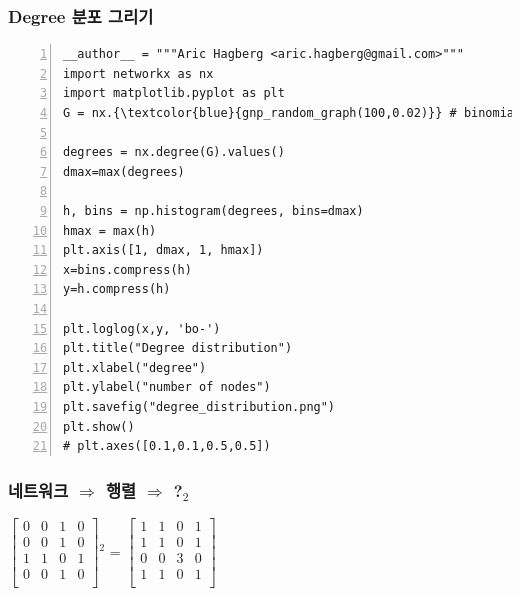 \documentclass{beamer}
\newcommand{\fbckg}[1]{\usebackgroundtemplate{\texttt{[image: \#1]}}}%
\begin{document}
{
\fbckg{degree_distribution2.png}
\begin{frame}[fragile]
\frametitle{Degree 분포 그리기}
\tiny\begin{Verbatim}[numbers=left,commandchars=\\\{\}]
__author__ = """Aric Hagberg <aric.hagberg@gmail.com>"""
import networkx as nx
import matplotlib.pyplot as plt
G = nx.{\textcolor{blue}{gnp_random_graph(100,0.02)}} # binomial_graph 생성

degrees = nx.degree(G).values()
dmax=max(degrees)

h, bins = np.histogram(degrees, bins=dmax)
hmax = max(h)
plt.axis([1, dmax, 1, hmax])
x=bins.compress(h)
y=h.compress(h)

plt.loglog(x,y, 'bo-')
plt.title("Degree distribution")
plt.xlabel("degree")
plt.ylabel("number of nodes")
plt.savefig("degree_distribution.png")
plt.show()
# plt.axes([0.1,0.1,0.5,0.5])
\end{Verbatim}
\end{frame}
}

\begin{frame}[fragile]
\frametitle{네트워크 $\Rightarrow$ 행렬 $\Rightarrow$ ?$_2$}
\begin{center}
\huge
{\(
  \begin{bmatrix}
    0 & 0 & 1 & 0\\
    0 & 0 & 1 & 0\\
    1 & 1 & 0 & 1\\
    0 & 0 & 1 & 0\\
  \end{bmatrix}
\)$^2$}
=
\(
  \begin{bmatrix}
    1 & 1 & 0 & 1\\
    1 & 1 & 0 & 1\\
    0 & 0 & 3 & 0\\
    1 & 1 & 0 & 1\\
  \end{bmatrix}
\)
\end{center}
\end{frame}
\end{document}
